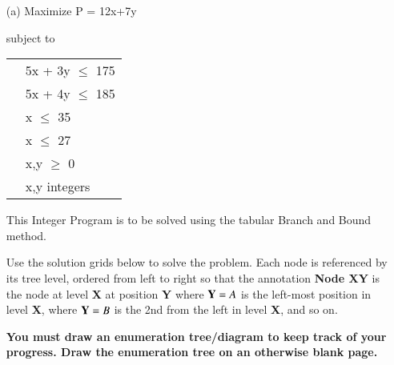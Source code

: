 \documentclass[12pt]{article}
\begin{document}
				\begin{itemize}
					\item[(a)]
					Maximize P = 12x+7y
					
					subject to
					
					\begin{tabular}{cl}
						
						\phantom{space}
						\phantom{space} & 5x + 3y $\leq$ 175\\
						& 5x  + 4y $\leq$ 185\\
						& x $\leq$ 35\\
						& x $\leq$ 27\\
						& x,y $\geq$ 0\\
						& x,y integers\\
						
					\end{tabular}
					
					\smallskip
					This Integer Program is to be solved using the tabular Branch and Bound method.
					
					\newpage
					Use the solution grids below to solve the problem. Each node is referenced by its tree level, ordered from left to right so that the annotation {\bf Node XY} is the node at level {\bf X} at position {\bf Y} where ${\bf Y}=A$ is the left-most position in level {\bf X}, where ${\bf Y}=B$ is the 2nd from the left in level {\bf X}, and so on.
					
					{\bf You must draw an enumeration tree/diagram to keep track of your progress. Draw the enumeration tree on an otherwise blank page.}
					
					
					
					
					
					
				\end{itemize}
				
\end{document}
